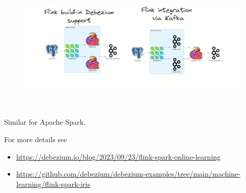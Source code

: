 \documentclass[10pt,utf8]{beamer}
\begin{document}
\begin{frame}
    \begin{figure}
        \hspace*{-1.1cm}
        \includegraphics[height=6cm]{./img/debezium_flink.eps}
    \end{figure}
    
    \vspace{-1cm}
    Similar for Apache Spark.
    \vspace{0.5cm}
    
    For more details see
    \begin{itemize}
        \item  \footnotesize \color{blue}\url{https://debezium.io/blog/2023/09/23/flink-spark-online-learning}\color{black}
        \item  \footnotesize \color{blue}\url{https://github.com/debezium/debezium-examples/tree/main/machine-learning/flink-spark-iris}\color{black}
    \end{itemize}
\end{frame}
\end{document}
